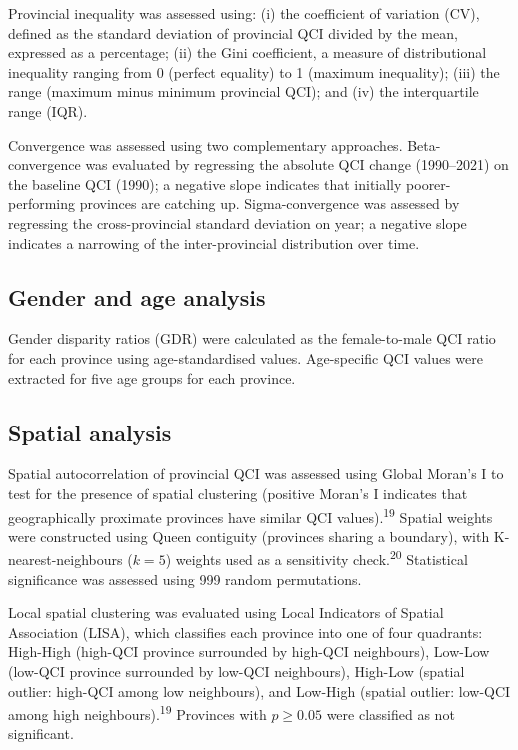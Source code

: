 \documentclass[12pt]{article}
\begin{document}
Provincial inequality was assessed using: (i) the coefficient of variation (CV), defined as the standard deviation of provincial QCI divided by the mean, expressed as a percentage; (ii) the Gini coefficient, a measure of distributional inequality ranging from 0 (perfect equality) to 1 (maximum inequality); (iii) the range (maximum minus minimum provincial QCI); and (iv) the interquartile range (IQR).

Convergence was assessed using two complementary approaches. Beta-convergence was evaluated by regressing the absolute QCI change (1990--2021) on the baseline QCI (1990); a negative slope indicates that initially poorer-performing provinces are catching up. Sigma-convergence was assessed by regressing the cross-provincial standard deviation on year; a negative slope indicates a narrowing of the inter-provincial distribution over time.

\subsection{Gender and age analysis}

Gender disparity ratios (GDR) were calculated as the female-to-male QCI ratio for each province using age-standardised values. Age-specific QCI values were extracted for five age groups for each province.

\subsection{Spatial analysis}

Spatial autocorrelation of provincial QCI was assessed using Global Moran's I to test for the presence of spatial clustering (positive Moran's I indicates that geographically proximate provinces have similar QCI values).\textsuperscript{19} Spatial weights were constructed using Queen contiguity (provinces sharing a boundary), with K-nearest-neighbours ($k=5$) weights used as a sensitivity check.\textsuperscript{20} Statistical significance was assessed using 999 random permutations.

Local spatial clustering was evaluated using Local Indicators of Spatial Association (LISA), which classifies each province into one of four quadrants: High-High (high-QCI province surrounded by high-QCI neighbours), Low-Low (low-QCI province surrounded by low-QCI neighbours), High-Low (spatial outlier: high-QCI among low neighbours), and Low-High (spatial outlier: low-QCI among high neighbours).\textsuperscript{19} Provinces with $p \geq 0.05$ were classified as not significant.
\end{document}
